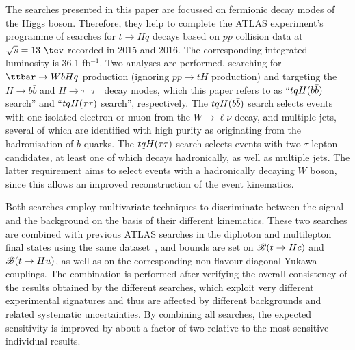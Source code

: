 The searches presented in this paper are focussed on fermionic decay modes of the Higgs boson. Therefore, they help to complete the 
ATLAS experiment's programme of searches for $t \to Hq$ decays based on $pp$ collision
data at $\sqrt{s}=13~\tev$ recorded in 2015 and 2016. The corresponding integrated luminosity is 36.1 fb$^{-1}$.
Two analyses are performed, searching for $\ttbar \to WbHq$ production (ignoring $pp \to tH$ production) and targeting the 
$H \to b\bar{b}$ and $H \to \tau^+\tau^-$ decay modes, which this paper refers to as ``$tqH(b\bar{b})$ search'' and ``$tqH(\tau\tau)$ search'', respectively.
The $tqH(b\bar{b})$ search selects events with one isolated electron or muon from the $W \to \ell\nu$ decay, and multiple jets, several 
of which are identified with high purity as originating from the hadronisation of $b$-quarks. 
The $tqH(\tau\tau)$ search selects events with two $\tau$-lepton candidates, at least one of which decays hadronically, as well as multiple jets.
The latter requirement aims to select events with a hadronically decaying $W$ boson, since this allows an improved reconstruction of the
event kinematics.

Both searches employ multivariate techniques to discriminate between the signal and the background on the basis of their different kinematics. 
These two searches are combined with previous ATLAS searches in the diphoton and multilepton final states using the same dataset~\cite{Aaboud:2017mfd,Aaboud:2018pob}, and bounds are set on $\mathscr{B}(t\to Hc)$ and $\mathscr{B}(t\to Hu)$, as well as on the corresponding non-flavour-diagonal Yukawa couplings. 
The combination is performed after verifying the overall consistency of the results obtained by the different searches, which exploit very different
experimental signatures and thus are affected by different backgrounds and related systematic uncertainties. 
By combining all searches, the expected sensitivity is improved by about a factor of two relative to the most sensitive individual results. 






